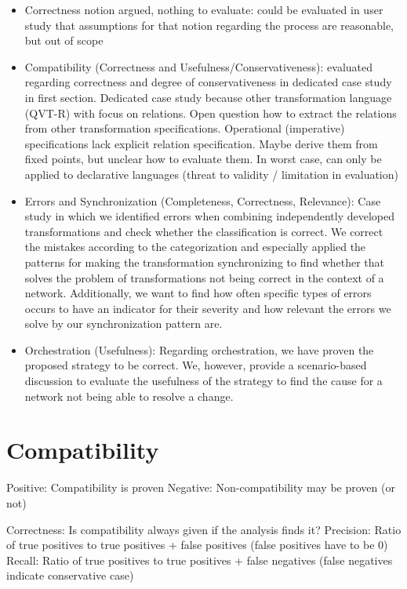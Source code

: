 \begin{itemize}
    \item Correctness notion argued, nothing to evaluate: could be evaluated in user study that assumptions for that notion regarding the process are reasonable, but out of scope
    \item Compatibility (Correctness and Usefulness/Conservativeness): evaluated regarding correctness and degree of conservativeness in dedicated case study in first section. Dedicated case study because other transformation language (QVT-R) with focus on relations. Open question how to extract the relations from other transformation specifications. Operational (imperative) specifications lack explicit relation specification. Maybe derive them from fixed points, but unclear how to evaluate them. In worst case, can only be applied to declarative languages (threat to validity / limitation in evaluation)
    \item Errors and Synchronization (Completeness, Correctness, Relevance): Case study in which we identified errors when combining independently developed transformations and check whether the classification is correct. We correct the mistakes according to the categorization and especially applied the patterns for making the transformation synchronizing to find whether that solves the problem of transformations not being correct in the context of a network. Additionally, we want to find how often specific types of errors occurs to have an indicator for their severity and how relevant the errors we solve by our synchronization pattern are.
    \item Orchestration (Usefulness): Regarding orchestration, we have proven the proposed strategy to be correct. We, however, provide a scenario-based discussion to evaluate the usefulness of the strategy to find the cause for a network not being able to resolve a change.
\end{itemize}

\section{Compatibility}

Positive: Compatibility is proven
Negative: Non-compatibility may be proven (or not)

{Correctness: Is compatibility always given if the analysis finds it?}
{Precision: Ratio of true positives to true positives + false positives (false positives have to be 0)}
{Recall: Ratio of true positives to true positives + false negatives (false negatives indicate conservative case)}


